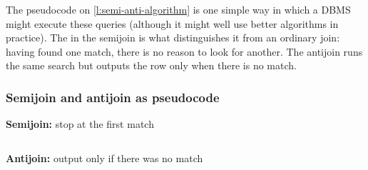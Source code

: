 The pseudocode on \autoref{l:semi-anti-algorithm} is one simple way in which a DBMS might execute these queries (although it might well use better algorithms in practice).
The  in the semijoin is what distinguishes it from an ordinary join: having found one match, there is no reason to look for another.
The antijoin runs the same search but outputs the row only when there is no match.

\begin{frame}
    \label{s:semi-anti-algorithm}
    \frametitle{Semijoin and antijoin as pseudocode}
    \textbf{Semijoin:} stop at the first match
    \vspace{0.2em}
    \inputminted[fontsize=\footnotesize]{python}{code/semijoin-python.py}
    \vspace{0.2em}\pause
    \textbf{Antijoin:} output only if there was no match
    \vspace{0.2em}
    \inputminted[fontsize=\footnotesize]{python}{code/antijoin-python.py}
\end{frame}
\label{l:semi-anti-algorithm}

